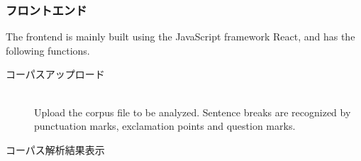 \subsubsection{フロントエンド}
\label{sec:2-1-1}
The frontend is mainly built using the JavaScript framework React, and has the following functions.

\begin{description}
   \item[コーパスアップロード]\mbox{}\\
Upload the corpus file to be analyzed. Sentence breaks are recognized by punctuation marks, exclamation points
and question marks.
   \item[コーパス解析結果表示]\mbox{}\\

\end{description}
